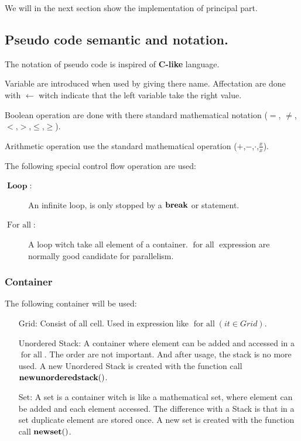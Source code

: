 We will in the next section show the implementation of principal part.

\subsection{Pseudo code semantic and notation.}

The notation of pseudo code is inspired of \textbf{C-like} language.

Variable are introduced when used by giving there name.
Affectation are done with $\gets$ witch indicate that the left variable take the right value.

Boolean operation are done with there standard mathematical notation ($=$, $\neq$,$<$,$>$,$\leq$,$\geq$).

Arithmetic operation use the standard mathematical operation ($+$,$-$,$\cdot$,$\frac{x}{x}$).

The following special control flow operation are used:
\begin{description}
 \item[$\mathop{\textbf{Loop}}$:] An infinite loop, is only stopped by a $\mathop{\textbf{break}}$ or \Return statement.
 \item[$\mathop{\textbf{For all}}$:] A loop witch take all element of a container. $\mathop{\textbf{for all}}$ expression are normally good candidate for parallelism.
\end{description}

\subsubsection{Container}

The following container will be used:
\begin{enumerate}
 \item[Grid:] Consist of all cell. Used in expression like $\mathop{\textbf{for all}}(it \in Grid)$.
 \item[Unordered Stack:] A container where element can be added and accessed in a $\mathop{\textbf{for all}}$. The order are not important.
 And after usage, the stack is no more used.
 A new Unordered Stack is created with the function call $\mathop{\textbf{newunorderedstack}}()$.
 \item[Set:] A set is a container witch is like a mathematical set, where element can be added and each element accessed.
 The difference with a Stack is that in a set duplicate element are stored once.
 A new set is created with the function call $\mathop{\textbf{newset}}()$.
\end{enumerate}

